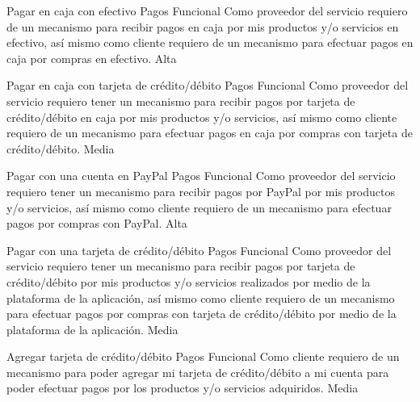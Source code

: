 \begin{ReqSpec}
	
	{Pagar en caja con efectivo}
	{Pagos}
	{Funcional}
	{Como proveedor del servicio requiero de un mecanismo para recibir pagos en caja por mis productos y/o servicios en efectivo, así mismo como cliente requiero de un mecanismo para efectuar pagos  en caja por compras en efectivo.}
	{Alta}
	
	{Pagar en caja con tarjeta de crédito/débito}
	{Pagos}
	{Funcional}
	{Como proveedor del servicio requiero tener un mecanismo para recibir pagos por tarjeta de crédito/débito en caja por mis productos y/o servicios, así mismo como cliente requiero de un mecanismo para efectuar pagos en caja por compras con tarjeta de crédito/débito.}
	{Media}
	
	{Pagar con una cuenta en PayPal}
	{Pagos}
	{Funcional}
	{Como proveedor del servicio requiero tener un mecanismo para recibir pagos por PayPal por mis productos y/o servicios, así mismo como cliente requiero de un mecanismo para efectuar pagos por compras con PayPal.}
	{Alta}
	
	{Pagar con una tarjeta de crédito/débito}
	{Pagos}
	{Funcional}
	{Como proveedor del servicio requiero tener un mecanismo para recibir pagos por tarjeta de crédito/débito por mis productos y/o servicios realizados por medio de la plataforma de la aplicación, así mismo como cliente requiero de un mecanismo para efectuar pagos por compras con tarjeta de crédito/débito por medio de la plataforma de la aplicación.}
	{Media}
	
	{Agregar tarjeta de crédito/débito}
	{Pagos}
	{Funcional}
	{Como cliente requiero de un mecanismo para poder agregar mi tarjeta de crédito/débito a mi cuenta para poder efectuar pagos por los productos y/o servicios adquiridos.}
	{Media}	

\end{ReqSpec}